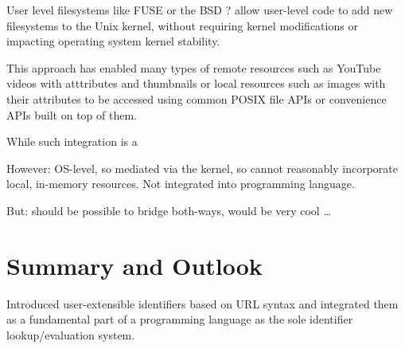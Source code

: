 \documentclass[preprint,authoryear]{acm_proc_article-sp}
\begin{document}
User level filesystems like FUSE   \cite{fuse} or the BSD  ? \cite{bsdfuse} allow
user-level code to add new filesystems to the Unix kernel, without requiring
kernel modifications or impacting operating system kernel stability.

This approach has enabled many types of remote resources such as 
YouTube videos with atttributes and thumbnails or local resources
such as images with their attributes to be accessed using common
POSIX file APIs or convenience APIs built on top of them.

While such integration is a

However:  OS-level, so mediated via the kernel, so cannot reasonably incorporate
local, in-memory resources.   Not integrated into programming language.

But:  should be possible to bridge both-ways, would be very cool \ldots


\section{Summary and Outlook}

Introduced user-extensible identifiers based on URL syntax and 
integrated them as a fundamental part of a programming language
as the sole identifier lookup/evaluation system.












\balancecolumns
\end{document}

